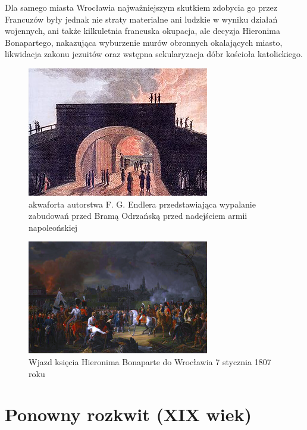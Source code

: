 \documentclass{article}
\begin{document}
Dla samego miasta Wrocławia najważniejszym skutkiem zdobycia go przez Francuzów były jednak nie straty materialne ani ludzkie w wyniku działań wojennych, ani także kilkuletnia francuska okupacja, ale decyzja Hieronima Bonapartego, nakazująca wyburzenie murów obronnych okalających miasto, likwidacja zakonu jezuitów oraz wstępna sekularyzacja dóbr kościoła katolickiego.

\begin{figure}[htbp!!]
\centering
\includegraphics[scale=6.0]{5.jpg}
\caption{akwaforta autorstwa F. G. Endlera przedstawiająca wypalanie zabudowań przed Bramą Odrzańską przed nadejściem armii napoleońskiej}
\label{fig:5}
\end{figure}

\begin{figure}[htbp!!]
\centering
\includegraphics[scale=2.5]{6.png}
\caption{Wjazd księcia Hieronima Bonaparte do Wrocławia 7 stycznia 1807 roku}
\label{fig:6}
\end{figure}


\section{Ponowny rozkwit (XIX wiek)}
\end{document}
